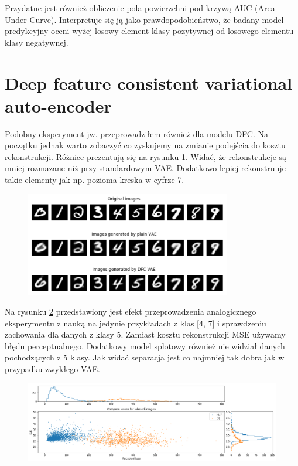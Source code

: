 Przydatne jest również obliczenie pola powierzchni pod krzywą AUC (Area Under Curve). Interpretuje się ją jako prawdopodobieństwo, że badany model predykcyjny oceni wyżej losowy element klasy pozytywnej od losowego elementu klasy negatywnej.

\section{Deep feature consistent variational auto-encoder}

Podobny eksperyment jw. przeprowadziłem również dla modelu DFC. Na początku jednak warto zobaczyć co zyskujemy na zmianie podejścia do kosztu rekonstrukcji. Różnice prezentują się na rysunku \ref{fig:vae_dfc_recon}. Widać, że rekonstrukcje są mniej rozmazane niż przy standardowym VAE. Dodatkowo lepiej rekonstruuje takie elementy jak np. pozioma kreska w cyfrze 7. 

\begin{figure}[h!]
    \centering
    \includegraphics[width=0.8\textwidth]{images/vae_dfc_gen}
    \caption{}
    \label{fig:vae_dfc_recon}
\end{figure}

Na rysunku \ref{fig:dfc_mnist_compare} przedstawiony jest efekt przeprowadzenia analogicznego eksperymentu z nauką na jedynie przykładach z klas [4, 7] i sprawdzeniu zachowania dla danych z klasy 5. Zamiast kosztu rekonstrukcji MSE używamy błędu perceptualnego. Dodatkowy model splotowy również nie widział danych pochodzących z 5 klasy. Jak widać separacja jest co najmniej tak dobra jak w przypadku zwykłego VAE.

\begin{figure}[h!]
    \centering
    \includegraphics[width=1.0\textwidth]{images/dfc_mnist_compare}
    \caption{}
    \label{fig:dfc_mnist_compare}
\end{figure}
